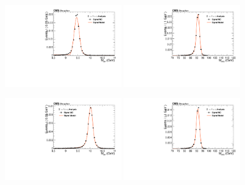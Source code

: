 \begin{figure}[!htbp]
\begin{center}


\includegraphics[width=0.45\textwidth]{figures/fitPlotFiles2D/ZToUpsilonPhotonSignalAndBackgroundFit/mMuMNU_ZToUpsilon1SPhotonSignalAndBackgroundFit_Signal_Cat2}\hspace*{1.cm}
\includegraphics[width=0.45\textwidth]{figures/fitPlotFiles2D/ZToUpsilonPhotonSignalAndBackgroundFit/mHZ_ZToUpsilon1SPhotonSignalAndBackgroundFit_Signal_Cat2_default}\hspace*{1.cm}

\includegraphics[width=0.45\textwidth]{figures/fitPlotFiles2D/ZToUpsilonPhotonSignalAndBackgroundFit/mMuMNU_ZToUpsilon2SPhotonSignalAndBackgroundFit_Signal_Cat2}\hspace*{1.cm}
\includegraphics[width=0.45\textwidth]{figures/fitPlotFiles2D/ZToUpsilonPhotonSignalAndBackgroundFit/mHZ_ZToUpsilon2SPhotonSignalAndBackgroundFit_Signal_Cat2_default}\hspace*{1.cm}


\end{center}
\end{figure}
